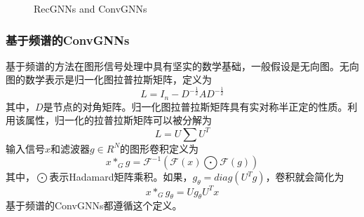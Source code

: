 \begin{figure}[htbp]
	\caption{RecGNNs and ConvGNNs}
	\label{fig:RGNN_CGNN} 
\end{figure}	

\subsubsection{基于频谱的ConvGNNs}

基于频谱的方法在图形信号处理中具有坚实的数学基础，一般假设是无向图。无向图的数学表示是归一化图拉普拉斯矩阵，定义为
\[L=I_n-D^{-\frac{1}{2}}AD^{-\frac{1}{2}}\]
其中，$D$是节点的对角矩阵。归一化图拉普拉斯矩阵具有实对称半正定的性质。利用该属性，归一化的拉普拉斯矩阵可以被分解为
\[L=U\sum U^T\]
输入信号$x$和滤波器$g\in R^N$的图形卷积定义为
\[
x*_Gg=\mathcal{F}^{-1}(\mathcal{F}(x)\bigodot \mathcal{F}(g))
\]
其中，$\bigodot$表示Hadamard矩阵乘积。如果，$g_{\theta}=diag(U^Tg)$，卷积就会简化为
\[
x*_Gg_{\theta}=Ug_{\theta}U^Tx
\]
基于频谱的ConvGNNs都遵循这个定义。

